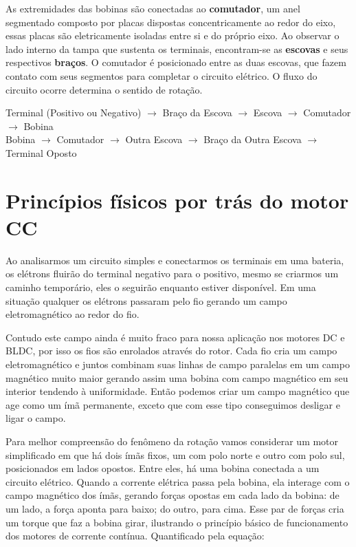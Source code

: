 \documentclass[11pt]{article}
\begin{document}
    As extremidades das bobinas são conectadas ao \textbf{comutador}, um anel segmentado composto por placas dispostas concentricamente ao redor do eixo, essas 
    placas são eletricamente isoladas entre si e do próprio eixo. Ao observar o lado interno da tampa que sustenta os terminais, encontram-se as \textbf{escovas} 
    e seus respectivos \textbf{braços}. O comutador é posicionado entre as duas escovas, que fazem contato com seus segmentos para completar o circuito elétrico. 
    O fluxo do circuito ocorre determina o sentido de rotação.

    \begin{center}
        Terminal (Positivo ou Negativo) \( \rightarrow \) Braço da Escova \( \rightarrow \) Escova \( \rightarrow \) Comutador \( \rightarrow \) Bobina \\
        Bobina \( \rightarrow \) Comutador \( \rightarrow \) Outra Escova \( \rightarrow \) Braço da Outra Escova \( \rightarrow \) Terminal Oposto
    \end{center}

\section{Princípios físicos por trás do motor CC}
    \noindent Ao analisarmos um circuito simples e conectarmos os terminais em uma bateria, os elétrons fluirão do terminal negativo para o positivo, 
    mesmo se criarmos um caminho temporário, eles o seguirão enquanto estiver disponível. Em uma situação qualquer os elétrons passaram pelo fio gerando 
    um campo eletromagnético ao redor do fio.

    Contudo este campo ainda é muito fraco para nossa aplicação nos motores DC e BLDC, por isso os fios são enrolados através do rotor. Cada fio cria um campo eletromagnético
    e juntos combinam suas linhas de campo paralelas em um campo magnético muito maior gerando assim uma bobina com campo magnético em seu 
    interior tendendo à uniformidade. Então podemos criar um campo magnético que age como um ímã permanente, exceto que com esse tipo conseguimos desligar e ligar o 
    campo.
    
    Para melhor compreensão do fenômeno da rotação vamos considerar um motor simplificado em que há dois ímãs fixos, um com polo norte e outro com polo sul, posicionados 
    em lados opostos. Entre eles, há uma bobina conectada a um circuito elétrico. Quando a corrente elétrica passa pela bobina, ela interage com o campo magnético dos ímãs, 
    gerando forças opostas em cada lado da bobina: de um lado, a força aponta para baixo; do outro, para cima. Esse par de forças cria um torque que faz a bobina girar, 
    ilustrando o princípio básico de funcionamento dos motores de corrente contínua. Quantificado pela equação:
\end{document}
